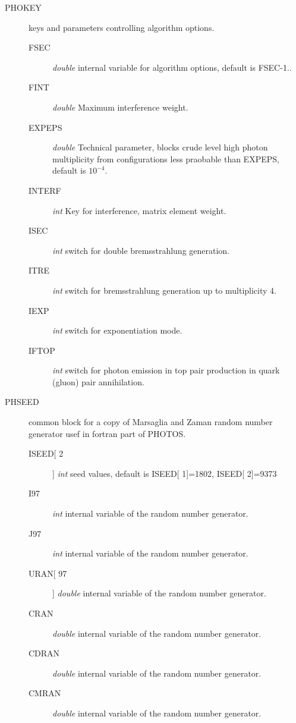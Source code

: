 \documentclass[]{Photos_interface_design}
\begin{document}
\begin{description}
\item[PHOKEY] keys and parameters controlling algorithm options.
    \begin{description}
	\item[FSEC]   \textit{double} internal variable for algorithm options, default is FSEC-1..
	\item[FINT]   \textit{double} Maximum interference weight.
	\item[EXPEPS] \textit{double} Technical parameter, blocks crude level high photon multiplicity from configurations less praobable than EXPEPS, default is $10^{-4}$.
	\item[INTERF] \textit{int} Key for interference, matrix element weight.
	\item[ISEC]   \textit{int} switch for double bremsstrahlung generation.
	\item[ITRE]   \textit{int} switch for bremsstrahlung generation up to multiplicity 4.
	\item[IEXP]   \textit{int} switch for exponentiation mode.
	\item[IFTOP]  \textit{int} switch for photon emission in top pair production in quark (gluon) pair annihilation.
    \end{description}
\end{description}

\begin{description}
\item[PHSEED] common block for a copy of Marsaglia and Zaman random number generator usef in fortran part of PHOTOS.
    \begin{description}
	\item[ISEED[ 2]]  \textit{int} seed values, default is  ISEED[ 1]=1802, ISEED[ 2]=9373
	\item[I97]        \textit{int} internal variable of the random number generator.
	\item[J97]        \textit{int} internal variable of the random number generator.
	\item[URAN[ 97]]  \textit{double} internal variable of the random number generator.
	\item[CRAN]       \textit{double} internal variable of the random number generator.
	\item[CDRAN]      \textit{double} internal variable of the random number generator.
	\item[CMRAN]      \textit{double} internal variable of the random number generator.
    \end{description}
\end{description}
\end{document}
